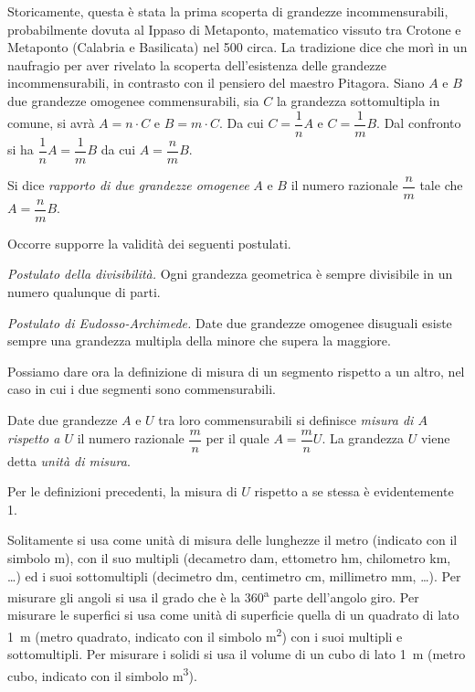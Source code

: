 Storicamente, questa è stata la prima scoperta di grandezze incommensurabili, probabilmente dovuta al Ippaso di Metaponto, matematico vissuto tra Crotone e Metaponto (Calabria e Basilicata) nel 500 \aC circa. La tradizione dice che morì in un naufragio per aver rivelato la scoperta dell'esistenza delle grandezze incommensurabili, in contrasto con il pensiero del maestro Pitagora.
Siano $A$ e $B$ due grandezze omogenee commensurabili, sia $C$ la grandezza sottomultipla in comune, si avrà $A=n\cdot C$ e $B=m\cdot C$. Da cui $C=\dfrac{1}{n}A$ e $C=\dfrac{1}{m}B$. Dal confronto si ha $\dfrac{1}{n}A=\dfrac{1}{m}B$ da cui $A=\dfrac{n}{m}B$.

\begin{definizione}
Si dice \emph{rapporto di due grandezze omogenee} $A$ e $B$ il numero razionale $\dfrac{n}{m}$ tale che $A=\dfrac{n}{m}B$.
\end{definizione}
Occorre supporre la validità dei seguenti postulati.\vspace{8pt}

\noindent \emph{Postulato della divisibilità.} Ogni grandezza geometrica è sempre divisibile in un numero qualunque di parti.\vspace{8pt}

\noindent \emph{Postulato di Eudosso-Archimede.} Date due grandezze omogenee disuguali esiste sempre una grandezza multipla della minore che supera la maggiore.\vspace{8pt}

Possiamo dare ora la definizione di misura di un segmento rispetto a un altro, nel caso in cui i due segmenti sono commensurabili.
\begin{definizione}
Date due grandezze $A$ e $U$ tra loro commensurabili si definisce \emph{misura di $A$ rispetto a $U$} il numero razionale $\dfrac{m}{n}$ per il quale $A=\dfrac{m}{n}U$. La grandezza $U$ viene detta \emph{unità di misura}.
\end{definizione}

Per le definizioni precedenti, la misura di $U$ rispetto a se stessa è evidentemente 1.

Solitamente si usa come unità di misura delle lunghezze il metro (indicato con il simbolo m), con il suo multipli (decametro dam, ettometro hm, chilometro km, \ldots{}) ed i suoi sottomultipli (decimetro dm, centimetro cm, millimetro mm, \ldots{}). Per misurare gli angoli si usa il grado che è la 360\textsuperscript{a} parte dell'angolo giro. Per misurare le superfici si usa come unità di superficie quella di un quadrato di lato 1~m (metro quadrato, indicato con il simbolo m\textsuperscript{2}) con i suoi multipli e sottomultipli. Per misurare i solidi si usa il volume di un cubo di lato 1~m (metro cubo, indicato con il simbolo m\textsuperscript{3}).

